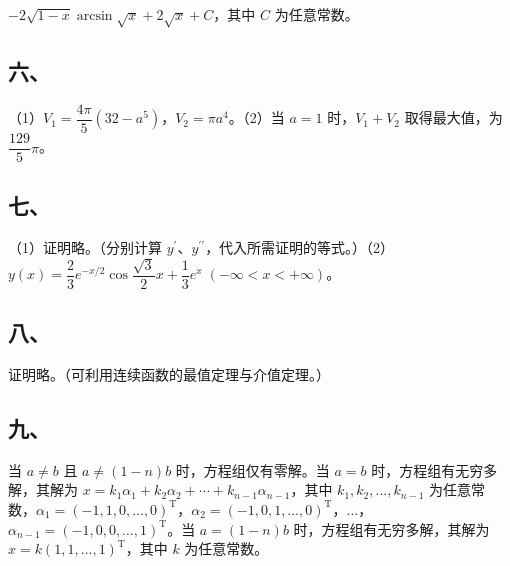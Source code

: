 \documentclass[UTF8,12pt]{ctexart}
\begin{document}
\(\displaystyle -2\sqrt{1-x}\arcsin\sqrt x+2\sqrt x+C\)，其中 \(\displaystyle C\) 为任意常数。


\subsection*{六、}

（1）\(\displaystyle V_1=\dfrac{\displaystyle 4\pi}{\displaystyle 5}(32-a^5)\)，\(\displaystyle V_2=\pi a^4\)。（2）当 \(\displaystyle a=1\) 时，\(\displaystyle V_1+V_2\) 取得最大值，为 \(\displaystyle \dfrac{\displaystyle 129}{\displaystyle 5}\pi\)。


\subsection*{七、}

（1）证明略。（分别计算 \(\displaystyle y^{\prime}\)、\(\displaystyle y^{\prime\prime}\)，代入所需证明的等式。）（2）\(\displaystyle y(x)=\dfrac{\displaystyle 2}{\displaystyle 3}e^{-x/2}\cos\dfrac{\displaystyle \sqrt3}{\displaystyle 2}x+\dfrac{\displaystyle 1}{\displaystyle 3}e^x\;(-\infty<x<+\infty)\)。


\subsection*{八、}

证明略。（可利用连续函数的最值定理与介值定理。）


\subsection*{九、}

当 \(\displaystyle a\ne b\) 且 \(\displaystyle a\ne(1-n)b\) 时，方程组仅有零解。当 \(\displaystyle a=b\) 时，方程组有无穷多解，其解为 \(\displaystyle x=k_1\alpha_1+k_2\alpha_2+\cdots+k_{n-1}\alpha_{n-1}\)，其中 \(\displaystyle k_1,\allowbreak k_2,\allowbreak \ldots,\allowbreak k_{n-1}\) 为任意常数，\(\displaystyle \alpha_1=(-1,\allowbreak 1,\allowbreak 0,\allowbreak \ldots,\allowbreak 0)^{\mathrm T}\)，\(\displaystyle \alpha_2=(-1,\allowbreak 0,\allowbreak 1,\allowbreak \ldots,\allowbreak 0)^{\mathrm T}\)，\(\displaystyle \ldots\)，\(\displaystyle \alpha_{n-1}=(-1,\allowbreak 0,\allowbreak 0,\allowbreak \ldots,\allowbreak 1)^{\mathrm T}\)。当 \(\displaystyle a=(1-n)b\) 时，方程组有无穷多解，其解为 \(\displaystyle x=k(1,\allowbreak 1,\allowbreak \ldots,\allowbreak 1)^{\mathrm T}\)，其中 \(\displaystyle k\) 为任意常数。
\end{document}
